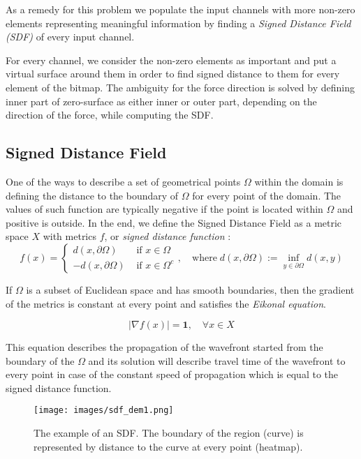 As a remedy for this problem we populate the input channels with more non-zero elements representing meaningful information by finding a \emph{Signed Distance Field (SDF)} of every input channel\cite{bibl:sdf}.
\medskip

For every channel, we consider the non-zero elements as important and put a virtual surface around them in order to find signed distance to them for every element of the bitmap.
The ambiguity for the force direction is solved by defining inner part of zero-surface as either inner or outer part, depending on the direction of the force, while computing the SDF.
\medskip

\subsection{Signed Distance Field}

One of the ways to describe a set of geometrical points $\Omega$ within the domain is defining the distance to the boundary of $\Omega$ for every point of the domain. 
The values of such function are typically negative if the point is located within $\Omega$ and positive is outside.
In the end, we define the Signed Distance Field as a metric space $X$ with metrics $f$, or \emph{signed distance function} :    
\begin{equation}
f(x) = \begin{cases}
			d(x, \partial \Omega) & \mbox{ if } x\in\Omega  \\
			-d(x, \partial \Omega) & \mbox{ if } x\in\Omega^c 
\end{cases} 
	, \quad \mathrm{where} \; d(x, \partial \Omega) := \inf_{y \in \partial \Omega}d(x, y)
\end{equation} 

If $\Omega$ is a subset of Euclidean space and has smooth boundaries, then the gradient of the metrics is constant at every point and satisfies the \emph{Eikonal equation}.
\medskip

\begin{equation}
 |\nabla f(x)| = \mathbf{1}, \quad \forall x \in X
\end{equation}

This equation describes the propagation of the wavefront started from the boundary of the $\Omega$ and its solution will describe travel time of the wavefront to every point in case of the constant speed of propagation which is equal to the signed distance function.
\begin{figure}[ht]
	\centering
	\texttt{[image: images/sdf\_dem1.png]}
	\label{fig:sdf_ex}
	\caption{The example of an SDF. The boundary of the region (curve) is represented by distance to the curve at every point (heatmap).}
\end{figure}
\medskip

